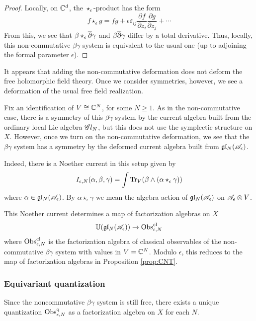 \begin{proof}
Locally, on $\mathbb C^d$, the $\star_{\epsilon}$-product has the form
\[
f \star_{\epsilon} g = fg + \epsilon \varepsilon_{ij} \frac{\partial f}{\partial z_i} \frac{\partial g}{\partial z_j} + \cdots
\]
From this, we see that $\beta \star_{\epsilon} \overline{\partial} \gamma$ and $\beta \overline{\partial} \gamma$ differ by a total derivative. 
Thus, locally, this non-commutative $\beta\gamma$ system is equivalent to the usual one (up to adjoining the formal parameter $\epsilon$).
\end{proof}

It appears that adding the non-commutative deformation does not deform the free holomorphic field theory. 
Once we consider symmetries, however, we see a deformation of the usual free field realization. 

Fix an identification of $V \cong \mathbb C^N$, for some $N \geq 1$. 
As in the non-commutative case, there is a symmetry of this $\beta\gamma$ system by the current algebra built from the ordinary local Lie algebra $\mathscr G l_N$, but this does not use the symplectic structure on $X$. 
However, once we turn on the non-commutative deformation, we see that the $\beta\gamma$ system has a symmetry by the deformed current algebra built from $\mathfrak{g} \mathfrak{l}_N(\mathscr A_{\epsilon})$. 

Indeed, there is a Noether current in this setup given by
\[
I_{\epsilon,N} (\alpha, \beta,\gamma) = \int {\rm Tr}_{V}(\beta \wedge (\alpha \star_{\epsilon} \gamma)) 
\]
where $\alpha \in \mathfrak{g} \mathfrak{l}_N(\mathscr A_{\epsilon})$.
By $\alpha \star_\epsilon \gamma$ we mean the algebra action of $\mathfrak{g} \mathfrak{l}_N(\mathscr A_{\epsilon})$ on $\mathscr A_\epsilon \otimes V$. 

\begin{lem}
This Noether current determines a map of factorization algebras on $X$
\[
\mathbb U(\mathfrak{g} \mathfrak{l}_N(\mathscr A_{\epsilon})) \to {\rm Obs}^{{\rm cl}}_{\epsilon, N}
\]
where ${\rm Obs}^{{\rm cl}}_{\epsilon, N}$ is the factorization algebra of classical observables of the non-commutative $\beta\gamma$ system with values in $V = \mathbb C^N$.
Modulo $\epsilon$, this reduces to the map of factorization algebras in Proposition \ref{prop:CNT}.
\end{lem}

\subsubsection{Equivariant quantization}

Since the noncommutative $\beta\gamma$ system is still free, there exists a unique quantization ${\rm Obs}^{\rm q}_{\epsilon, N}$ as a factorization algebra on $X$ for each $N$. 

